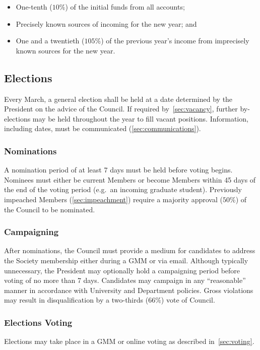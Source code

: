 \begin{itemize}
      \item One-tenth ($10\%$) of the initial funds from all accounts;
      \item Precisely known sources of incoming for the new year; and
      \item One and a twentieth ($105\%$) of the previous year's income from imprecisely
            known sources for the new year.
\end{itemize}

\subsection{Elections}\label{sec:elections}
Every March, a general election shall be held at a date determined by the
President on the advice of the Council. If required by~\ref{sec:vacancy},
further by-elections may be held throughout the year to fill vacant positions.
Information, including dates, must be communicated (\ref{sec:communications}).

\subsubsection{Nominations}
A nomination period of at least 7 days must be held before voting begins.
Nominees must either be current Members or become Members within 45 days of the
end of the voting period (e.g.\ an incoming graduate student). Previously
impeached Members (\ref{sec:impeachment}) require a majority approval ($50\%$)
of the Council to be nominated.

\subsubsection{Campaigning}
After nominations, the Council must provide a medium for candidates to address
the Society membership either during a GMM or via email. Although typically
unnecessary, the President may optionally hold a campaigning period before
voting of no more than 7 days. Candidates may campaign in any ``reasonable''
manner in accordance with University and Department policies. Gross violations
may result in disqualification by a two-thirds ($66\%$) vote of Council.

\subsubsection{Elections Voting}
Elections may take place in a GMM or online voting as described
in~\ref{sec:voting}.

